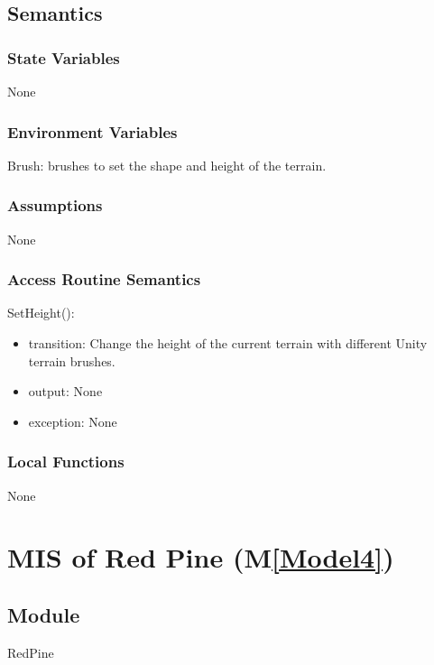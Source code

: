 \documentclass[12pt, titlepage]{article}
\newcommand{\mref}[1]{M\ref{#1}}
\begin{document}
\subsection{Semantics}

\subsubsection{State Variables}
None

\subsubsection{Environment Variables}

Brush: brushes to set the shape and height of the terrain.

\subsubsection{Assumptions}

None

\subsubsection{Access Routine Semantics}

\noindent SetHeight():
\begin{itemize}
\item transition: Change the height of the current terrain with different Unity terrain brushes.
\item output: None
\item exception: None
\end{itemize}

\subsubsection{Local Functions}
None

\newpage

\newcommand{\tn}{Red Pine }
\newcommand{\tmn}{RedPine}
\newcommand{\constn}{Red\ Pine}

\section{MIS of \tn (\mref{Model4})}

\subsection{Module}
\tmn
\end{document}
